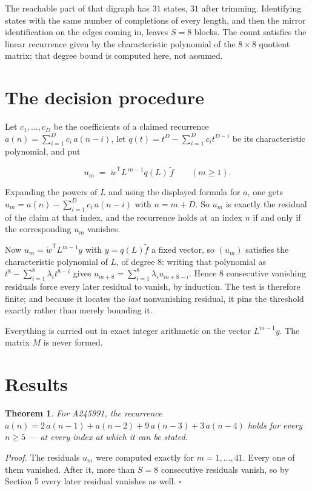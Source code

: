 \documentclass[11pt]{article}
\newtheorem{theorem}{Theorem}
\theoremstyle{definition}
\begin{document}
The reachable part of that digraph has $31$ states, $31$ after trimming. Identifying states with the same number of completions of every length, and then the mirror identification on the edges coming in, leaves $S = 8$ blocks. The count satisfies the linear recurrence given by the characteristic polynomial of the $8\times8$ quotient matrix; that degree bound is computed here, not assumed.

\section{The decision procedure}

Let $c_1,\dots,c_D$ be the coefficients of a claimed recurrence $a(n) = \sum_{i=1}^{D} c_i\,a(n-i)$, let $q(t) = t^{D} - \sum_{i=1}^{D} c_i t^{D-i}$ be its characteristic polynomial, and put

\[u_m \;=\; \tilde w^{\mathsf T} L^{\,m-1} q(L)\,\tilde f \qquad (m \ge 1).\]

Expanding the powers of $L$ and using the displayed formula for $a$, one gets $u_m = a(n) - \sum_{i=1}^{D} c_i\,a(n-i)$ with $n = m + D$. So $u_m$ is exactly the residual of the claim at that index, and the recurrence holds at an index $n$ if and only if the corresponding $u_m$ vanishes.

Now $u_m = \tilde w^{\mathsf T} L^{m-1} y$ with $y = q(L)\tilde f$ a fixed vector, so $(u_m)$ satisfies the characteristic polynomial of $L$, of degree $8$: writing that polynomial as $t^{8} - \sum_{i=1}^{8} \lambda_i t^{8-i}$ gives $u_{m+8} = \sum_{i=1}^{8} \lambda_i u_{m+8-i}$. Hence $8$ consecutive vanishing residuals force every later residual to vanish, by induction. The test is therefore finite; and because it locates the {\itshape last} nonvanishing residual, it pins the threshold exactly rather than merely bounding it.

Everything is carried out in exact integer arithmetic on the vector $L^{m-1}y$. The matrix $M$ is never formed.

\section{Results}

\begin{theorem} For A245991, the recurrence $a(n) = 2\,a(n-1) + a(n-2) + 9\,a(n-3) + 3\,a(n-4)$ holds for every $n \ge 5$ --- at every index at which it can be stated.\end{theorem}

{\itshape Proof.} The residuals $u_m$ were computed exactly for $m = 1,\dots,41$. Every one of them vanished. After it, more than $S = 8$ consecutive residuals vanish, so by Section 5 every later residual vanishes as well. $\square$
\end{document}
